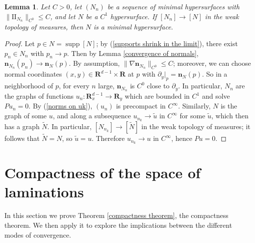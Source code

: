 \documentclass[reqno,11pt]{amsart}
\newcommand{\RR}{\mathbf{R}}
\newcommand{\Sph}{\mathbf S}
\newcommand*\dif{\mathop{}\!\mathrm{d}}
\DeclareMathOperator{\supp}{supp}
\newcommand{\Two}{\mathrm{I\!I}}
\newcommand{\normal}{\mathbf n}
\newtheorem{lemma}[theorem]{Lemma}
\theoremstyle{definition}
\newtheorem{example}[theorem]{Example}
\numberwithin{equation}{section}
\begin{document}
\begin{lemma}\label{measured convergence is smooth convergence}
Let $C > 0$, let $(N_n)$ be a sequence of minimal hypersurfaces with $\|\Two_{N_n}\|_{C^0} \leq C$, and let $N$ be a $C^1$ hypersurface.
If $[N_n] \to [N]$ in the weak topology of measures, then $N$ is a minimal hypersurface.
\end{lemma}
\begin{proof}
Let $p \in N = \supp [N]$; by (\ref{supports shrink in the limit}), there exist $p_n \in N_n$ with $p_n \to p$.
Then by Lemma \ref{convergence of normals}, $\normal_{N_n}(p_n) \to \normal_N(p)$.
By assumption, $\|\nabla \normal_{N_n}\|_{C^0} \leq C$; moreover, we can choose normal coordinates $(x, y) \in \RR^{d - 1} \times \RR$ at $p$ with $\partial_y|_p = \normal_N(p)$.
So in a neighborhood of $p$, for every $n$ large, $\normal_{N_n}$ is $C^0$ close to $\partial_y$.
In particular, $N_n$ are the graphs of functions $u_n: \RR^{d - 1}_x \to \RR_y$ which are bounded in $C^1$ and solve $Pu_n = 0$.
By (\ref{norms on uk}), $(u_n)$ is precompact in $C^\infty$.
Similarly, $N$ is the graph of some $u$, and along a subsequence $u_{n_k} \to \tilde u$ in $C^\infty$ for some $\tilde u$, which then has a graph $\tilde N$.
In particular, $[N_{n_k}] \to [\tilde N]$ in the weak topology of measures; it follows that $\tilde N = N$, so $\tilde u = u$.
Therefore $u_{n_k} \to u$ in $C^\infty$, hence $Pu = 0$.
\end{proof}




\section{Compactness of the space of laminations}\label{CompactnessSec}
In this section we prove Theorem \ref{compactness theorem}, the compactness theorem.
We then apply it to explore the implications between the different modes of convergence.

\end{document}

